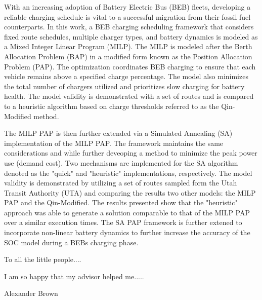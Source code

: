 \documentclass[ee,thesis]{usuthesis}
\begin{document}
\begin{publicabstract}

With an increasing adoption of Battery Electric Bus (BEB) fleets, developing a reliable charging schedule is vital to a successful migration from their fossil fuel counterparts. In this work, a BEB charging scheduling framework that considers fixed route schedules, multiple charger types, and battery dynamics is modeled as a Mixed Integer Linear Program (MILP). The MILP is modeled after the Berth Allocation Problem (BAP) in a modified form known as the Position Allocation Problem (PAP). The optimization coordinates BEB charging to ensure that each vehicle remains above a specified charge percentage. The model also minimizes the total number of chargers utilized and prioritizes slow charging for battery health. The model validity is demonstrated with a set of routes and is compared to a heuristic algorithm based on charge thresholds referred to as the Qin-Modified method.

The MILP PAP is then further extended via a Simulated Annealing (SA) implementation of the MILP PAP. The framework maintains the same considerations and while further deveoping a method to minimize the peak power use (demand cost). Two mechanisms are implemented for the SA algorithm denoted as the "quick" and "heuristic" implementations, respectively. The model validity is demonstrated by utilizing a set of routes sampled form the Utah Transit Authority (UTA) and comparing the results two other models: the MILP PAP and the Qin-Modified. The results presented show that the "heuristic" approach was able to generate a solution comparable to that of the MILP PAP over a similar execution times. The SA PAP framework is further extened to incorporate non-linear battery dynamics to further increase the accuracy of the SOC model during a BEBs charging phase.
\end{publicabstract}
\begin{dedication}
\begin{center}
To all the little people....
\end{center}
%
\end{dedication}
\begin{acknowledgments}
I am so happy that my advisor helped me.....
\\
\begin{flushright}
Alexander Brown
\end{flushright}
\end{acknowledgments}
\end{document}
